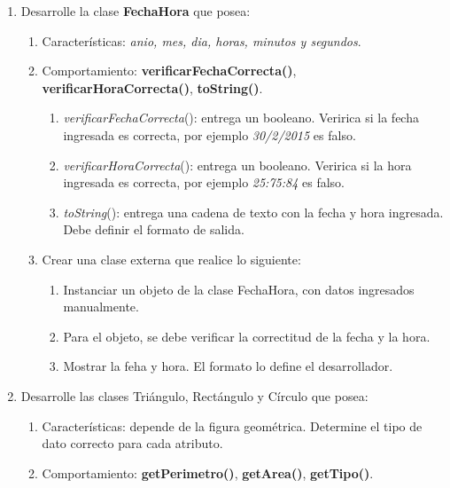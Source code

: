 \documentclass{article}
\begin{document}
\begin{enumerate}
		\item Desarrolle la clase \textbf{FechaHora} que posea:
		\begin{enumerate}
			\item Caracter\'isticas: \emph{anio, mes, dia, horas, minutos y segundos}.
			\item Comportamiento: \textbf{verificarFechaCorrecta()}, \textbf{verificarHoraCorrecta()}, \textbf{toString()}. 
			\begin{enumerate}
				\item \emph{verificarFechaCorrecta}(): entrega un booleano. Veririca si la fecha ingresada es correcta, por ejemplo \emph{30/2/2015} es falso.
				\item \emph{verificarHoraCorrecta}(): entrega un booleano. Veririca si la hora ingresada es correcta, por ejemplo \emph{25:75:84} es falso.
				\item \emph{toString}(): entrega una cadena de texto con la fecha y hora ingresada. Debe definir el formato de salida.
			\end{enumerate}
			\item[] Crear una clase externa que realice lo siguiente:
			\begin{enumerate}
				\item Instanciar un objeto de la clase FechaHora, con datos ingresados manualmente.
				\item Para el objeto, se debe verificar la correctitud de la fecha y la hora.
				\item Mostrar la feha y hora. El formato lo define el desarrollador.
			\end{enumerate}
		\end{enumerate}
		\item Desarrolle las clases Tri\'angulo, Rect\'angulo y C\'irculo que posea:
		\begin{enumerate}
			\item Caracter\'isticas: depende de la figura geom\'etrica. Determine el tipo de dato correcto para cada atributo.
			\item Comportamiento: \textbf{getPerimetro()}, \textbf{getArea()}, \textbf{getTipo()}. 

\end{enumerate}
\end{enumerate}
\end{document}
